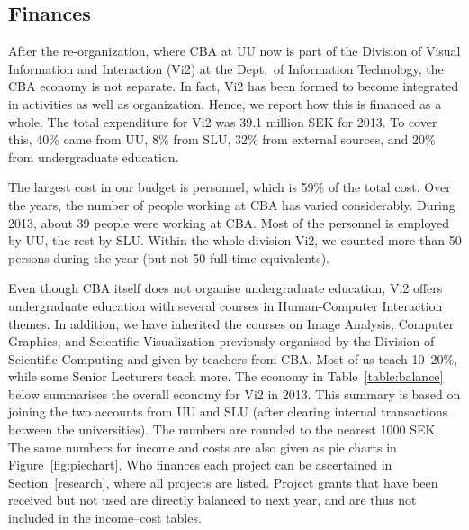 \subsection{Finances}
After the re-organization, where CBA at UU now is part of the Division of Visual Information and Interaction (Vi2) at the Dept.~of Information Technology, the CBA economy is not separate. 
 In fact, Vi2 has been formed to become integrated in activities as well as organization. Hence, we report how this is financed as a whole. The total expenditure for Vi2 was 39.1 million SEK for 2013. To cover this, 40\% came from UU, 8\% from SLU, 32\% from external sources, and 20\% from undergraduate education. 

The largest cost in our budget is personnel, which is 59\% of the total cost. Over the years, the number of people working at CBA has varied considerably. During 2013, about 39 people were working at CBA. Most of the personnel is employed by UU, the rest by SLU. Within the whole division Vi2, we counted more than 50 persons during the year (but not 50 full-time equivalents). 

Even though CBA itself does not organise undergraduate education, Vi2 offers undergraduate education with several courses in Human-Computer Interaction themes. In addition, we have inherited the courses on Image Analysis, Computer Graphics, and Scientific Visualization previously organised by the Division of Scientific Computing and given by teachers from CBA. Most of us teach 10--20\%, while some Senior Lecturers teach more. The economy in Table~\ref{table:balance} below summarises the overall economy for Vi2 in 2013. This summary is based on joining the two accounts from UU and SLU (after clearing internal transactions between the universities). The numbers are rounded to the nearest 1000 SEK. The same numbers for income and costs are also given as pie charts in Figure~\ref{fig:piechart}. Who finances each project can be ascertained in Section~\ref{research}, where all projects are listed. Project grants that have been received but not used are directly balanced to next year, and are thus not included in the income--cost tables.


